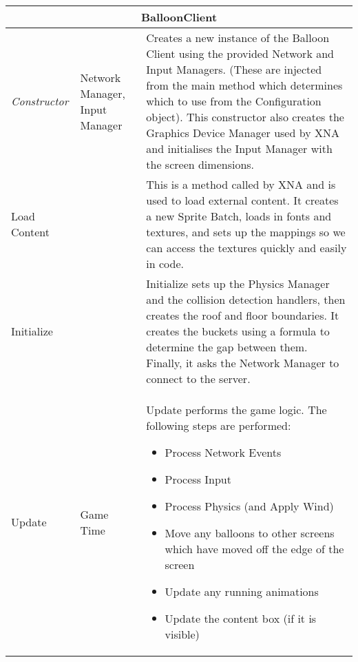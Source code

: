 \begin{table}[H]
\begin{tabular}{|p{3cm}|p{3.6cm}|p{9cm}|}
\hline
\multicolumn{3}{|c|}{BalloonClient} \\ \hline
\emph{Constructor} & Network Manager, Input Manager & 
Creates a new instance of the Balloon Client using the provided Network and 
Input Managers. (These are injected from the main method which determines which
to use from the Configuration object). This constructor also creates the 
Graphics Device Manager used by XNA and initialises the Input Manager with the
screen dimensions. \\ \hline

Load Content & & 
This is a method called by XNA and is used to load external content. It creates
a new Sprite Batch, loads in fonts and textures, and sets up the mappings so we
can access the textures quickly and easily in code. \\ \hline

Initialize & &
Initialize sets up the Physics Manager and the collision detection handlers, 
then creates the roof and floor boundaries. It creates the buckets using a 
formula to determine the gap between them. Finally, it asks the Network Manager
to connect to the server. \\ \hline

Update & Game Time &
Update performs the game logic. The following steps are performed:
\begin{itemize}
	\item{Process Network Events}
	\item{Process Input}
	\item{Process Physics (and Apply Wind)}
	\item{Move any balloons to other screens which have moved off the edge of the screen}
	\item{Update any running animations}
	\item{Update the content box (if it is visible)}
\end{itemize}
\\ \hline


\end{tabular}
\end{table}
